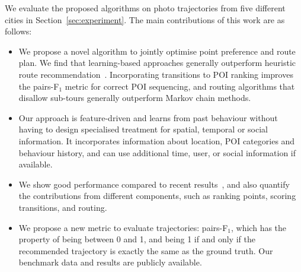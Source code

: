 We evaluate the proposed algorithms on photo trajectories from five different cities in Section~\ref{sec:experiment}.
The main contributions of this work are as follows:
\begin{itemize}
\setlength{\itemsep}{-2pt}
\item We propose a novel algorithm to jointly optimise point preference and route plan. We find that learning-based approaches generally outperform heuristic route recommendation~\cite{ijcai15}. Incorporating transitions to POI ranking improves the pairs-F$_1$ metric for correct POI sequencing, and routing algorithms that disallow sub-tours generally outperform Markov chain methods.
\item Our approach is feature-driven and learns from past behaviour without having to design specialised treatment for spatial, temporal or social information. It incorporates information about location, POI categories and behaviour history, and can use additional time, user, or social information if available.
\item We show good performance compared to recent results~\cite{ijcai15}, and also quantify the contributions from different components, such as ranking points, scoring transitions, and routing.
\item We propose a new metric to evaluate trajectories: pairs-F$_1$, which has the property of being between 0 and 1, and being 1 if and only if the recommended trajectory is exactly the same as the ground truth. Our benchmark data and results are publicly available.
\end{itemize}
